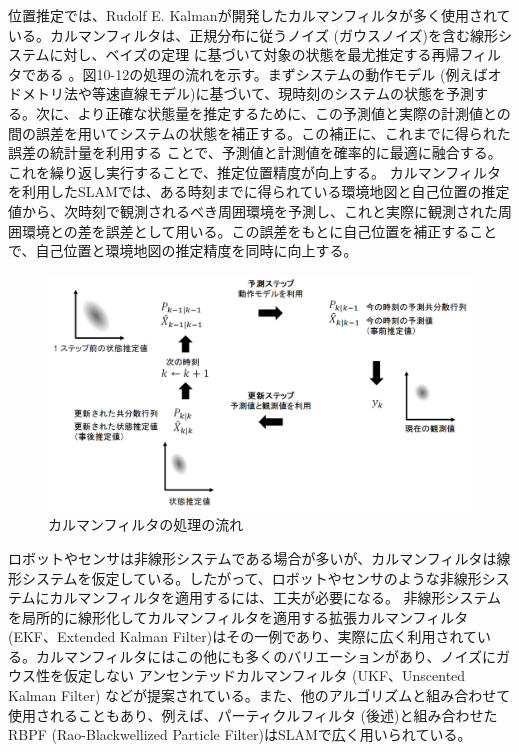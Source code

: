 位置推定では、Rudolf E. Kalmanが開発したカルマンフィルタが多く使用されている。カルマンフィルタは、正規分布に従うノイズ (ガウスノイズ)を含む線形システムに対し、ベイズの定理 に基づいて対象の状態を最尤推定する再帰フィルタである 。図10-12の処理の流れを示す。まずシステムの動作モデル  (例えばオドメトリ法や等速直線モデル)に基づいて、現時刻のシステムの状態を予測する。次に、より正確な状態量を推定するために、この予測値と実際の計測値との間の誤差を用いてシステムの状態を補正する。この補正に、これまでに得られた誤差の統計量を利用する ことで、予測値と計測値を確率的に最適に融合する。これを繰り返し実行することで、推定位置精度が向上する。
カルマンフィルタを利用したSLAMでは、ある時刻までに得られている環境地図と自己位置の推定値から、次時刻で観測されるべき周囲環境を予測し、これと実際に観測された周囲環境との差を誤差として用いる。この誤差をもとに自己位置を補正することで、自己位置と環境地図の推定精度を同時に向上する。

\begin{figure}[ht]
  \centering
  \includegraphics[width=\columnwidth]{pictures/chapter10/pic_10_12.png}
  \caption{カルマンフィルタの処理の流れ}
\end{figure}

ロボットやセンサは非線形システムである場合が多いが、カルマンフィルタは線形システムを仮定している。したがって、ロボットやセンサのような非線形システムにカルマンフィルタを適用するには、工夫が必要になる。 非線形システムを局所的に線形化してカルマンフィルタを適用する拡張カルマンフィルタ (EKF、Extended Kalman Filter)はその一例であり、実際に広く利用されている。カルマンフィルタにはこの他にも多くのバリエーションがあり、ノイズにガウス性を仮定しない アンセンテッドカルマンフィルタ (UKF、Unscented Kalman Filter)   などが提案されている。また、他のアルゴリズムと組み合わせて使用されることもあり、例えば、パーティクルフィルタ (後述)と組み合わせたRBPF (Rao-Blackwellized Particle Filter)はSLAMで広く用いられている。


